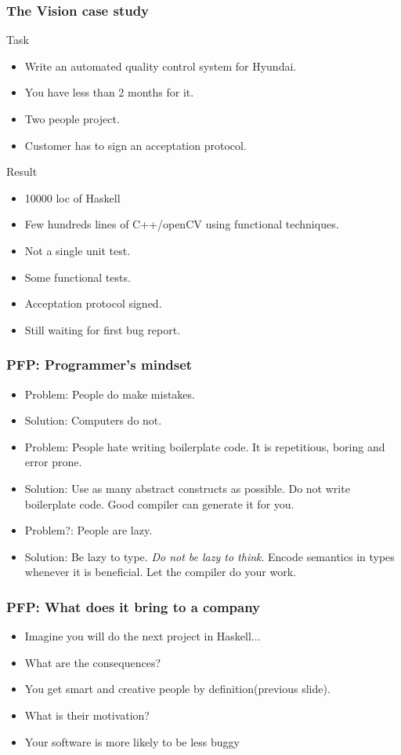\documentclass[11pt]{beamer}
\begin{document}
\begin{frame}
	\frametitle{The Vision case study}
	 {
	\begin{block}{Task}
		\begin{itemize}[<+->]
			\item Write an automated quality control system for Hyundai.
			\item You have less than 2 months for it.
			\item Two people project.
			\item Customer has to sign an acceptation protocol.
		\end{itemize}
	\end{block}
    }
	 {
	\begin{block}{Result}
		\begin{itemize}[<+->]
			\item 10000 loc of Haskell
			\item Few hundreds lines of C++/openCV using functional techniques.
			\item Not a single unit test.
			\item Some functional tests.
			\item Acceptation protocol signed.
			\item Still waiting for first bug report.
		\end{itemize}
	\end{block}
    }
\end{frame}

\begin{frame}
	\frametitle{PFP: Programmer's mindset}		
	\begin{itemize}[<+->]
		\item Problem: People do make mistakes. 
		\item Solution: Computers do not.
		\item Problem: People hate writing boilerplate code. It is repetitious, boring and error prone.
		\item Solution: Use as many abstract constructs as possible. Do not write boilerplate code. Good compiler can generate it for you.
		\item Problem?: People are lazy.
		\item Solution: Be lazy to type. \textit{Do not be lazy to think}. Encode semantics in types whenever it is beneficial. Let the compiler do your work.
	\end{itemize}
\end{frame}

\begin{frame} 
	\frametitle{PFP: What does it bring to a company}		
	\begin{itemize}[<+->]
		\item Imagine you will do the next project in Haskell...
		\item What are the consequences?
		\item You get smart and creative people by definition(previous slide).
		\item What is their motivation?
		\item Your software is more likely to be less buggy
	\end{itemize}
\end{frame}
\end{document}
